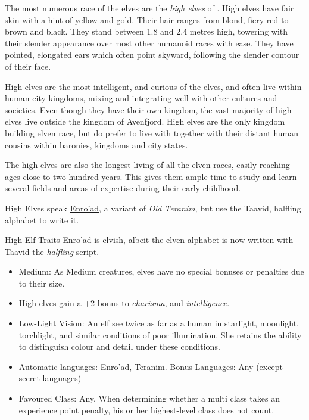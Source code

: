 The most numerous race of the elves are the \emph{high elves} of
. High elves have fair skin with a hint of yellow and
gold. Their hair ranges from blond, fiery red to brown and black. They stand
between 1.8 and 2.4 metres high, towering with their slender appearance over
most other humanoid races with ease. They have pointed, elongated ears which
often point skyward, following the slender contour of their face.

High elves are the most intelligent, and curious of the elves, and often live
within human city kingdoms, mixing and integrating well with other cultures
and societies. Even though they have their own kingdom, the vast majority of
high elves live outside the kingdom of Avenfjord. High elves are the only
kingdom building elven race, but do prefer to live with together with their
distant human cousins within baronies, kingdoms and city states.

The high elves are also the longest living of all the elven races, easily
reaching ages close to two-hundred years. This gives them ample time to study
and learn several fields and areas of expertise during their early childhood.

High Elves speak \hyperref[sec:Speak Language]{Enro'ad}, a variant of
\emph{Old Teranim}, but use the Taavid, halfling alphabet to write it.

\begin{35e}{High Elf Traits}
  \hyperref[sec:Speak Language]{Enro'ad} is elvish, albeit the elven alphabet
  is now written with Taavid the \emph{halfling} script.

  \begin{itemize}[noitemsep]
    \item Medium: As Medium creatures, elves have no special bonuses or
      penalties due to their size.
    \item High elves gain a +2 bonus to \emph{charisma}, and
      \emph{intelligence}.
    \item Low-Light Vision: An elf see twice as far as a human in starlight,
      moonlight, torchlight, and similar conditions of poor illumination. She
      retains the ability to distinguish colour and detail under these
      conditions.
    \item Automatic languages: Enro'ad, Teranim. Bonus Languages: Any (except
      secret languages)
    \item Favoured Class: Any. When determining whether a multi class takes an
      experience point penalty, his or her highest-level class does not count.
  \end{itemize}
\end{35e}

